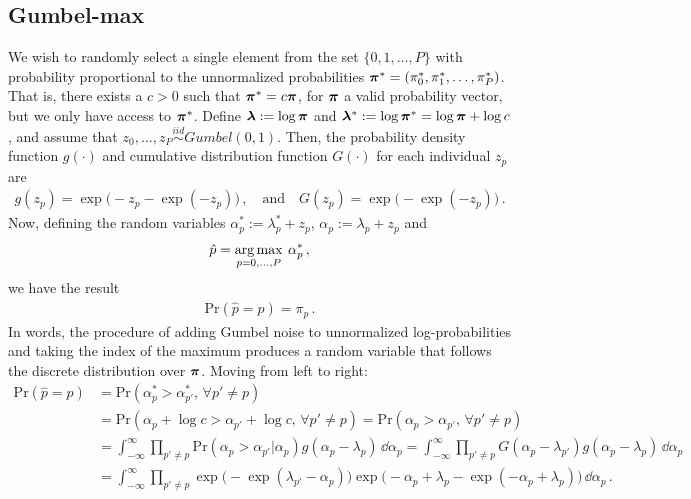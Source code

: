 \documentclass[12pt]{article} %
\newcommand{\argmax}{\operatornamewithlimits{arg\,max}}
\begin{document}
 

\subsection{Gumbel-max}
\newcommand{\p}{\mbox{p}}

We wish to randomly select a single element from the set $\{0,1,\dots,P\}$ with probability proportional to the unnormalized probabilities $\boldsymbol{\pi}^*=(\pi_0^*,\pi_1^*,\dots,\pi_P^*)$.  That is, there exists a $c>0$ such that $\boldsymbol{\pi}^* = c \boldsymbol{\pi}$, for $\boldsymbol{\pi}$ a valid probability vector, but we only have access to $\boldsymbol{\pi}^*$.  Define $\boldsymbol{\lambda}:= \log \boldsymbol{\pi}$ and $\boldsymbol{\lambda}^*:= \log \boldsymbol{\pi}^*=\log\boldsymbol{\pi} + \log c$,  and assume that $z_0,\dots,z_P\stackrel{iid}{\sim}Gumbel(0,1)$. Then, the probability density function $g(\cdot)$ and cumulative distribution function $G(\cdot)$ for each individual $z_p$ are
\begin{align}
g(z_p) = \exp\big(-z_p- \exp(-z_p)\big) \, , \quad \mbox{and} \quad G(z_p) = \exp \big( -\exp(-z_p) \big)\, .
\end{align}
Now, defining the random variables $\alpha^*_p:=\lambda^*_p+z_p$, $\alpha_p:=\lambda_p+z_p$ and  
\begin{align}
\hat{p} = \argmax_{p=0,\dots,P}\: \alpha^*_p \, ,
\end{align}
we have the result
\begin{align}
\mbox{Pr} (\hat{p} = p) = \pi_p \, .
\end{align}
In words, the procedure of adding Gumbel noise to unnormalized log-probabilities and taking the index of the maximum produces a random variable that follows the discrete distribution over $\boldsymbol{\pi}$.  Moving from left to right:
\begin{align*}
\mbox{Pr} (\hat{p} = p) &= \mbox{Pr} (\alpha^*_p > \alpha^*_{p'}, \, \forall p' \neq p ) \\
&= \mbox{Pr} (\alpha_p +\log c > \alpha_{p'} + \log c, \, \forall p' \neq p ) 
= \mbox{Pr} (\alpha_p  > \alpha_{p'} , \, \forall p' \neq p ) \\
&= \int_{-\infty}^\infty \prod_{p'\neq p} \mbox{Pr} (\alpha_p > \alpha_{p'}| \alpha_p) g(\alpha_p-\lambda_p) \, \dd \alpha_p 
= \int_{-\infty}^\infty \prod_{p'\neq p} G(\alpha_p-\lambda_{p'}) g(\alpha_p-\lambda_p) \, \dd \alpha_p \\
&=  \int_{-\infty}^\infty  \prod_{p'\neq p} \exp\big( -\exp(\lambda_{p'}-\alpha_p)\big) \exp\big(-\alpha_p+\lambda_p - \exp(-\alpha_p+\lambda_p) \big) \, \dd \alpha_p \, .
\end{align*}
\end{document}

